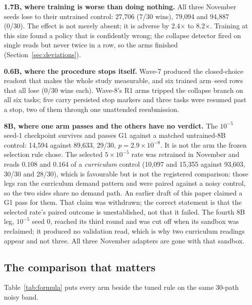 \documentclass[11pt]{article}
\begin{document}
\textbf{1.7B, where training is worse than doing nothing.} All three November seeds lose to their
untrained control: 27{,}706 (7/30 wins), 79{,}094 and 94{,}887 (0/30). The effect is not merely absent;
it is adverse by 2.4$\times$ to 8.2$\times$. Training at this size found a policy that is confidently
wrong; the collapse detector fired on single reads but never twice in a row, so the arms finished
(Section~\ref{sec:deviations}).

\textbf{0.6B, where the procedure stops itself.} Wave-7 produced the closed-choice readout that makes
the whole study measurable, and six trained arm--seed rows that all lose (0/30 wins each). Wave-8's R1
arms tripped the collapse branch on all six tasks; five carry persisted stop markers and three tasks
were resumed past a stop, two of them through one unattended resubmission.

\textbf{8B, where one arm passes and the others have no verdict.} The $10^{-5}$ seed-1 checkpoint
survives and passes G1 against a matched untrained-8B control: 14{,}594 against 89{,}633, 29/30,
$p = 2.9\times10^{-8}$.
It is not the arm the frozen selection rule chose. The selected $5\times10^{-5}$ rate was retrained in
November and reads $0.108$ and $0.164$ of a \emph{curriculum} control (10{,}097 and 15{,}355 against
93{,}603, 30/30 and 28/30), which is favourable but is not the registered comparison: those legs ran
the curriculum demand pattern and were paired against a noisy control, so the two sides share no demand
path. An earlier draft of this paper claimed a G1 pass for them. That claim was withdrawn; the correct
statement is that the selected rate's paired outcome is unestablished, not that it failed. The fourth
8B leg, $10^{-5}$ seed 0, reached its third round and was cut off when its sandbox was reclaimed; it
produced no validation read, which is why two curriculum readings appear and not three. All three
November adapters are gone with that sandbox.

\subsection{The comparison that matters}

Table~\ref{tab:formula} puts every arm beside the tuned rule on the same 30-path noisy band.
\end{document}

